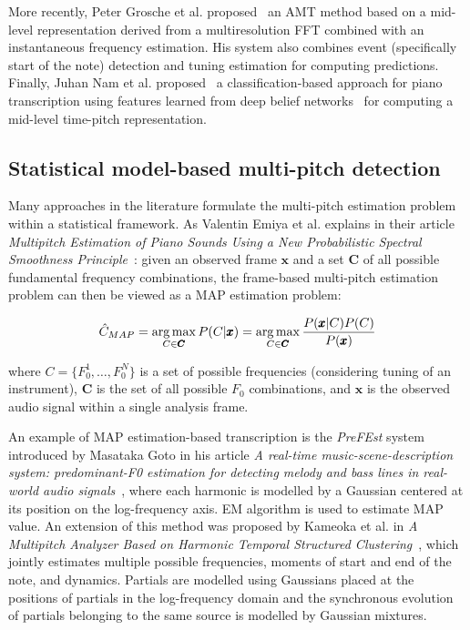 More recently, Peter Grosche et al. proposed~\cite{grosche2012automatic} an \ac{AMT} method based on a mid-level
representation derived from a multiresolution \ac{FFT} combined with an instantaneous frequency estimation. His system
also combines event (specifically start of the note) detection and tuning estimation for computing predictions. Finally,
Juhan Nam et al. proposed~\cite{nam2011classification} a classification-based approach for piano transcription using
features learned from deep belief networks~\cite{humphrey2013feature} for computing a mid-level time-pitch representation.

\subsection{Statistical model-based multi-pitch detection}\label{subsec:statistical-model-based-multi-pitch-detection}
Many approaches in the literature formulate the multi-pitch estimation problem within a statistical framework. As
Valentin Emiya et al. explains in their article \textit{Multipitch Estimation of Piano Sounds Using a New Probabilistic
Spectral Smoothness Principle}~\cite{proba-spectral-smoothness}: given an observed frame $\pmb{x}$ and a set $\pmb{C}$ of
all possible fundamental frequency combinations, the frame-based multi-pitch estimation problem can then be viewed as
a \ac{MAP} estimation problem:

\[ \hat{C}_{MAP} = \operatorname*{arg\,max}_{C \in \pmb{C}} P(C|\pmb{x}) = \operatorname*{arg\,max}_{C \in \pmb{C}} \frac{P(\pmb{x}|C)P(C)}{P(\pmb{x})} \]

where $C = \{F_0^1, \dots, F_0^N\}$ is a set of possible frequencies (considering tuning of an instrument), $\pmb{C}$ is
the set of all possible $F_0$ combinations, and $\pmb{x}$ is the observed audio signal within a single analysis frame.

An example of \ac{MAP} estimation-based transcription is the \textit{PreFEst} system introduced by Masataka Goto in his
article \textit{A real-time music-scene-description system: predominant-F0 estimation for detecting melody and bass
lines in real-world audio signals}~\cite{predominant-f0-estimation}, where each harmonic is modelled by a Gaussian
centered at its position on the log-frequency axis. \ac{EM} algorithm is used to estimate \ac{MAP} value.
An extension of this method was proposed by Kameoka et al. in \textit{A Multipitch Analyzer Based on Harmonic Temporal
Structured Clustering}~\cite{harmonic-temporal-structured-clustering}, which jointly estimates multiple possible
frequencies, moments of start and end of the note, and dynamics. Partials are modelled using Gaussians placed at
the positions of partials in the log-frequency domain and the synchronous evolution of partials belonging to the same
source is modelled by Gaussian mixtures.

